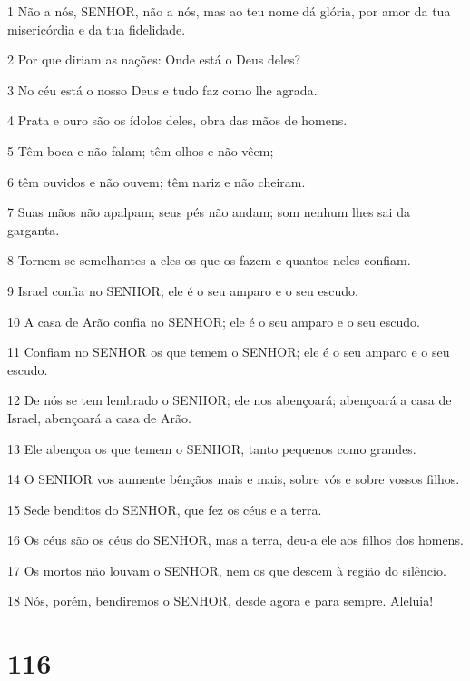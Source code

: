 \par 1 Não a nós, SENHOR, não a nós, mas ao teu nome dá glória, por amor da tua misericórdia e da tua fidelidade.
\par 2 Por que diriam as nações: Onde está o Deus deles?
\par 3 No céu está o nosso Deus e tudo faz como lhe agrada.
\par 4 Prata e ouro são os ídolos deles, obra das mãos de homens.
\par 5 Têm boca e não falam; têm olhos e não vêem;
\par 6 têm ouvidos e não ouvem; têm nariz e não cheiram.
\par 7 Suas mãos não apalpam; seus pés não andam; som nenhum lhes sai da garganta.
\par 8 Tornem-se semelhantes a eles os que os fazem e quantos neles confiam.
\par 9 Israel confia no SENHOR; ele é o seu amparo e o seu escudo.
\par 10 A casa de Arão confia no SENHOR; ele é o seu amparo e o seu escudo.
\par 11 Confiam no SENHOR os que temem o SENHOR; ele é o seu amparo e o seu escudo.
\par 12 De nós se tem lembrado o SENHOR; ele nos abençoará; abençoará a casa de Israel, abençoará a casa de Arão.
\par 13 Ele abençoa os que temem o SENHOR, tanto pequenos como grandes.
\par 14 O SENHOR vos aumente bênçãos mais e mais, sobre vós e sobre vossos filhos.
\par 15 Sede benditos do SENHOR, que fez os céus e a terra.
\par 16 Os céus são os céus do SENHOR, mas a terra, deu-a ele aos filhos dos homens.
\par 17 Os mortos não louvam o SENHOR, nem os que descem à região do silêncio.
\par 18 Nós, porém, bendiremos o SENHOR, desde agora e para sempre. Aleluia!

\chapter{116}

